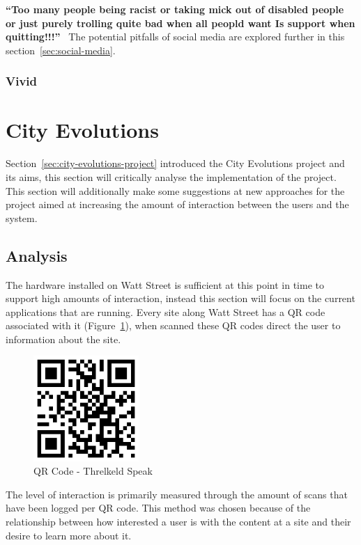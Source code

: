 \documentclass[a4paper,12pt]{article}
\begin{document}
\indent\textbf{``Too many people being racist or taking mick out of disabled people or just purely trolling quite bad when all peopld want Is support when quitting!!!''}~\citep{quitnow}
The potential pitfalls of social media are explored further in this section~\ref{sec:social-media}.

\subsubsection{Vivid}


\newpage
\section{City Evolutions}
Section~\ref{sec:city-evolutions-project} introduced the City Evolutions project and its aims, this section will critically analyse the implementation of the project.
This section will additionally make some suggestions at new approaches for the project aimed at increasing the amount of interaction between the users and the system.

\subsection{Analysis}
The hardware installed on Watt Street is sufficient at this point in time to support high amounts of interaction, instead this section will focus on the current applications that are running. 
Every site along Watt Street has a QR code associated with it (Figure~\ref{QR-threkeld-barcode}), when scanned these QR codes direct the user to information about the site. 
\begin{figure}[ht!]
	\centering
	\includegraphics[width=40mm]{./images/qrcode-threlkeld}
	\caption{QR Code - Threlkeld Speak}
	\label{QR-threkeld-barcode}
\end{figure}
The level of interaction is primarily measured through the amount of scans that have been logged per QR code. 
This method was chosen because of the relationship between how interested a user is with the content at a site and their desire to learn more about it.
\end{document}
